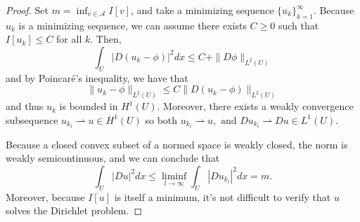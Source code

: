 \documentclass[12pt]{article}
\theoremstyle{plain}
\numberwithin{equation}{section}
\begin{document}
\begin{proof}
  Set $m = \inf_{v\in\mathcal{A}} I[v]$, and take a minimizing sequence $\{u_k\}_{k=1}^\infty$. Because $u_k$ is a minimizing sequence, we can assume there exists $C \ge 0$ such that $I[u_k]\le C$ for all $k$. Then,
  \[\int_U |D(u_k - \phi)|^2 dx \le C + \|D\phi\|_{L^2(U)}\]
  and by Poincar\'e's inequality, we have that 
  \[\|u_k-\phi\|_{L^2(U)} \le C\|D(u_k-\phi)\|_{L^2(U)}\]
  and thus $u_k$ is bounded in $H^1(U)$. Moreover, there exists a weakly convergence subsequence 
  \(u_{k_l}\rightharpoonup u\in H^1(U)\) so both \(u_{k_l}\rightharpoonup u,\text{ and }Du_{k_l}\rightharpoonup Du\in L^1(U)\).

  Because a closed convex subset of a normed space is weakly closed, the norm is weakly semicontinuous, and we can conclude that 
  \[\int_U |Du|^2 dx \le \liminf_{l\to\infty}\int_U |Du_{k_l}|^2dx = m.\]
  Moreover, because $I[u]$ is itself a minimum, it's not difficult to verify that $u$ solves the Dirichlet problem.
\end{proof}
\end{document}
